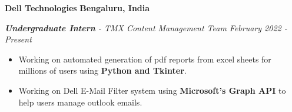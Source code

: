 \textbf{Dell Technologies}
\hfill {\faMapMarker} \textbf{Bengaluru, India} \par
\textit{\textbf{Undergraduate Intern} - TMX Content Management Team \hfill {\faCalendar} February 2022 - Present} \par
\begin{itemize}
	\item Working on automated generation of pdf reports from excel sheets for millions of users using \textbf{Python and Tkinter}.
	\item Working on Dell E-Mail Filter system using \textbf{Microsoft's Graph API} to help users manage outlook emails.
\end{itemize}\vspace{0.1cm} \par
